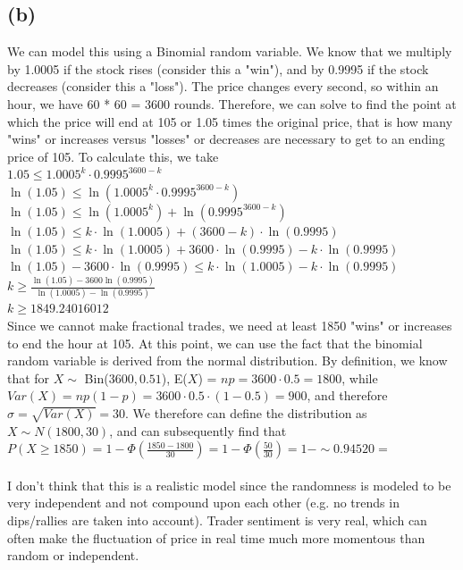 \documentclass{article}
\begin{document}
{\subsection*{(b)}
We can model this using a Binomial random variable. We know that we multiply by 1.0005 if the stock rises (consider this a "win"), and by 0.9995 if the stock decreases (consider this a "loss"). The price changes every second, so within an hour, we have 60 * 60 = 3600 rounds. Therefore, we can solve to find the point at which the price will end at 105 or 1.05 times the original price, that is how many "wins" or increases versus "losses" or decreases are necessary to get to an ending price of 105. To calculate this, we take \\ 
$1.05 \leq 1.0005^{k} \cdot 0.9995^{3600 - k}$ \\ 
$\ln(1.05) \leq \ln(1.0005^{k} \cdot 0.9995^{3600 - k})$ \\ 
$\ln(1.05) \leq \ln(1.0005^{k}) + \ln(0.9995^{3600 - k})$ \\ 
$\ln(1.05) \leq k \cdot \ln(1.0005) + (3600 - k) \cdot \ln(0.9995)$ \\ 
$\ln(1.05) \leq k \cdot \ln(1.0005) + 3600 \cdot \ln(0.9995) - k \cdot \ln(0.9995)$ \\ 
$\ln(1.05) - 3600 \cdot \ln(0.9995) \leq k \cdot \ln(1.0005) - k \cdot \ln(0.9995)$ \\ 
$k \geq \frac{\ln(1.05) - 3600\ln(0.9995)}{\ln(1.0005) - \ln(0.9995)}$ \\
$k \geq 1849.24016012$ \\ 
Since we cannot make fractional trades, we need at least 1850 "wins" or increases to end the hour at 105. At this point, we can use the fact that the binomial random variable is derived from the normal distribution. By definition, we know that for $X \sim $ Bin($3600, 0.51$), E($X$) = $np = 3600 \cdot 0.5 = 1800$, while $Var(X) = np(1 - p) = 3600 \cdot 0.5 \cdot (1 - 0.5) = 900$, and therefore $\sigma = \sqrt{Var(X)} = 30$. We therefore can define the distribution as $X \sim N(1800, 30)$, and can subsequently find that $P(X \geq 1850) = 1 - \Phi(\frac{1850 - 1800}{30}) = 1 - \Phi(\frac{50}{30}) = 1 - \sim 0.94520 = $  \\ \\ 
I don't think that this is a realistic model since the randomness is modeled to be very independent and not compound upon each other (e.g. no trends in dips/rallies are taken into account). Trader sentiment is very real, which can often make the fluctuation of price in real time much more momentous than random or independent.

}
\end{document}
